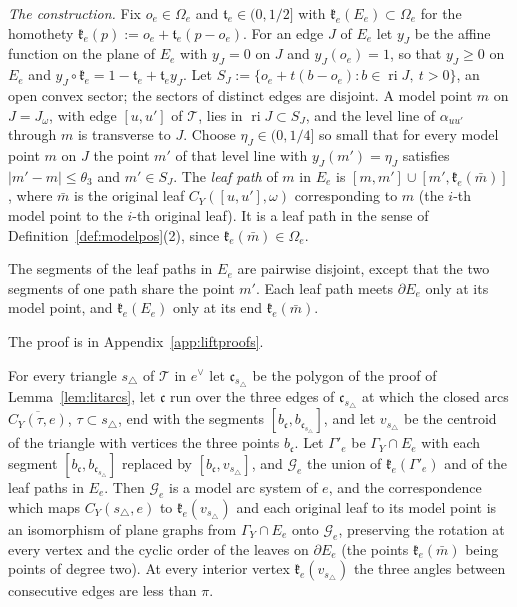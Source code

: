 \emph{The construction.} Fix $o_e\in\Omega_e$ and $\mathfrak t_e\in(0,1/2]$ with $\mathfrak k_e(E_e)\subset\Omega_e$ for the
homothety $\mathfrak k_e(p):=o_e+\mathfrak t_e(p-o_e)$. For an edge $J$ of $E_e$ let $y_J$ be the affine function on the
plane of $E_e$ with $y_J=0$ on $J$ and $y_J(o_e)=1$, so that $y_J\ge0$ on $E_e$ and $y_J\circ\mathfrak
k_e=1-\mathfrak t_e+\mathfrak t_ey_J$. Let $S_J:=\{o_e+t(b-o_e):b\in\operatorname{ri}J,\ t>0\}$, an open convex sector; the sectors
of distinct edges are disjoint. A model point $m$ on $J=J_\omega$, with edge $[u,u']$ of $\mathcal T$, lies in
$\operatorname{ri}J\subset S_J$, and the level line of $\alpha_{uu'}$ through $m$ is transverse to $J$. Choose
$\eta_J\in(0,1/4]$ so small that for every model point $m$ on $J$ the point $m'$ of that level line with $y_J(m')=\eta_J$
satisfies $|m'-m|\le\theta_3$ and $m'\in S_J$. The \emph{leaf path} of $m$ in $E_e$ is $[m,m']\cup[m',\mathfrak
k_e(\bar m)]$, where $\bar m$ is the original leaf $C_Y([u,u'],\omega)$ corresponding to $m$ (the $i$-th model point to
the $i$-th original leaf). It is a leaf path in the sense of Definition~\ref{def:modelpos}(2), since
$\mathfrak k_e(\bar m)\in\Omega_e$.

\begin{lemma}\label{lem:leafpaths}
The segments of the leaf paths in $E_e$ are pairwise disjoint, except that the two segments of one path share the
point $m'$. Each leaf path meets $\partial E_e$ only at its model point, and $\mathfrak k_e(E_e)$ only at its end
$\mathfrak k_e(\bar m)$.
\end{lemma}

The proof is in Appendix~\ref{app:liftproofs}.

\begin{lemma}\label{lem:arcsystems}
For every triangle ${s_\triangle}$ of $\mathcal T$ in $e^\vee$ let $\mathfrak c_{s_\triangle}$ be the polygon of the proof of
Lemma~\ref{lem:litarcs}, let $\mathfrak c$ run over the three edges of $\mathfrak c_{s_\triangle}$ at which the closed arcs
$\overline{C_Y(\tau,e)}$, $\tau\subset{s_\triangle}$, end with the segments $[b_{\mathfrak c},b_{\mathfrak c_{s_\triangle}}]$, and let
$v_{s_\triangle}$ be the centroid of the triangle with vertices the three points $b_{\mathfrak c}$. Let $\Gamma'_e$ be
$\Gamma_Y\cap E_e$ with each segment $[b_{\mathfrak c},b_{\mathfrak c_{s_\triangle}}]$ replaced by $[b_{\mathfrak c},v_{s_\triangle}]$,
and $\mathscr G_e$ the union of $\mathfrak k_e(\Gamma'_e)$ and of the leaf paths in $E_e$. Then $\mathscr G_e$ is a model
arc system of $e$, and the correspondence which maps $C_Y({s_\triangle},e)$ to $\mathfrak k_e(v_{s_\triangle})$ and each original leaf
to its model point is an isomorphism of plane graphs from $\Gamma_Y\cap E_e$ onto $\mathscr G_e$, preserving the
rotation at every vertex and the cyclic order of the leaves on $\partial E_e$ (the points $\mathfrak k_e(\bar m)$ being
points of degree two). At every interior vertex $\mathfrak k_e(v_{s_\triangle})$ the three angles between consecutive edges
are less than $\pi$.
\end{lemma}

